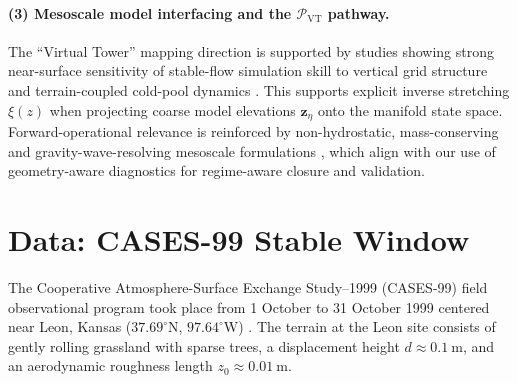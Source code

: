\documentclass[11pt,a4paper]{article}
\begin{document}
\paragraph{(3) Mesoscale model interfacing and the $\mathcal{P}_{\mathrm{VT}}$ pathway.}
The ``Virtual Tower'' mapping direction is supported by studies showing strong near-surface sensitivity of stable-flow simulation skill to vertical grid structure and terrain-coupled cold-pool dynamics \citep{Vosper2006, Vosper2013, Sheridan2010}. This supports explicit inverse stretching $\xi(z)$ when projecting coarse model elevations $\mathbf{z}_{\eta}$ onto the manifold state space. Forward-operational relevance is reinforced by non-hydrostatic, mass-conserving and gravity-wave-resolving mesoscale formulations \citep{Wood2014, Halliday2018}, which align with our use of geometry-aware diagnostics for regime-aware closure and validation.

\section{Data: CASES-99 Stable Window}
\label{sec:data}

The Cooperative Atmosphere-Surface Exchange Study--1999 (CASES-99) field observational program took place from 1 October to 31 October 1999 centered near Leon, Kansas ($37.69^\circ\text{N}$, $97.64^\circ\text{W}$) \citep{Poulos2002}. The terrain at the Leon site consists of gently rolling grassland with sparse trees, a displacement height $d \approx \SI{0.1}{\meter}$, and an aerodynamic roughness length $z_0 \approx \SI{0.01}{\meter}$.
\end{document}
